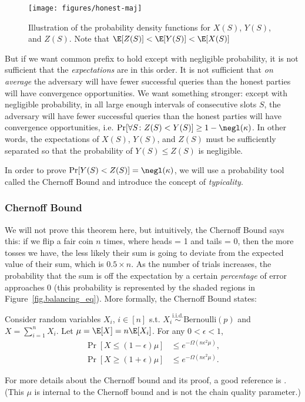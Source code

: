 \begin{figure}[ht]
    \centering
    \texttt{[image: figures/honest-maj]}
    \caption{Illustration of the probability density functions for $X(S)$, $Y(S)$, and $Z(S)$. Note that $\E[Z(S)] < \E[Y(S)] < \E[X(S)]$}
    \label{fig.expectation_gap}
\end{figure}

But if we want common prefix to hold except with negligible probability, it is not sufficient that the \emph{expectations} are in this order. It is not sufficient that \emph{on average} the adversary will have fewer successful queries than the honest parties will have convergence opportunities. We want something stronger: except with negligible probability, in all large enough intervals of consecutive slots $S$, the adversary will have fewer successful queries than the honest parties will have convergence opportunities, i.e. $\Pr[\forall S\colon Z(S) < Y(S)] \geq 1 - \negl(\kappa)$. In other words, the expectations of $X(S)$, $Y(S)$, and $Z(S)$ must be sufficiently separated so that the probability of $Y(S) \leq Z(S)$ is negligible.

In order to prove $\Pr[Y(S) < Z(S)] = \negl(\kappa)$, we will use a probability tool called the Chernoff Bound and introduce the concept of \textit{typicality}.

\subsubsection{Chernoff Bound}

We will not prove this theorem here, but intuitively, the Chernoff Bound says this: if we flip a fair coin $n$ times, where heads = 1 and tails = 0, then the more tosses we have, the less likely their sum is going to deviate from the expected value of their sum, which is $0.5 \times n$. As the number of trials increases, the probability that the sum is off the expectation by a certain \emph{percentage} of error approaches 0 (this probability is represented by the shaded regions in Figure~\ref{fig.balancing_eq}). More formally, the Chernoff Bound states:

\begin{theorem}
Consider random variables ${X_i}$, ${i\in [n]}$ s.t. $X_i \overset{\text{i.i.d.}}{\sim} \mathrm{Bernoulli}(p)$ and $X = \sum_{i=1}^{n} X_i$. Let $\mu = \E[X] = n \E[X_i]$. For any $0 < \epsilon < 1$,
\begin{align}
    \Pr[X \leq (1 - \epsilon) \mu ] &\leq e^{-\Omega(n\epsilon^2\mu)}, \\
    \Pr[X \geq (1 + \epsilon) \mu ] &\leq e^{-\Omega(n\epsilon^2\mu)}.
\end{align}
\end{theorem}
For more details about the Chernoff bound and its proof, a good reference is \cite{chernoff1952measure}.
(This $\mu$ is internal to the Chernoff bound and is not the chain quality parameter.)


